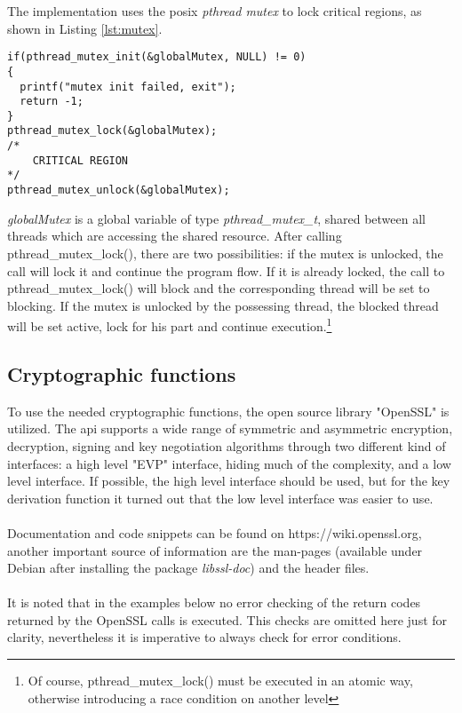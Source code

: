 The implementation uses the \gls{posix} \textit{pthread mutex} to lock critical regions, as shown in Listing \ref{lst:mutex}.  
\begin{lstlisting}[style=cStyle,caption={Locking a critical region},label=lst:mutex]
if(pthread_mutex_init(&globalMutex, NULL) != 0)
{
  printf("mutex init failed, exit");
  return -1;
}
pthread_mutex_lock(&globalMutex);
/*
    CRITICAL REGION
*/
pthread_mutex_unlock(&globalMutex);
\end{lstlisting}
\textit{globalMutex} is a global variable of type \textit{pthread\_mutex\_t}, shared between all threads which are accessing the shared resource. After calling pthread\_mutex\_lock(),
there are two possibilities: if the mutex is unlocked, the call will lock it and continue the program flow. If it is already locked, the call to pthread\_mutex\_lock() will block and
the corresponding thread will be set to blocking.
If the mutex is unlocked by the possessing thread, the blocked thread will be set active, lock for his part and continue execution.\footnote{Of course, pthread\_mutex\_lock() must
be executed in an atomic way, otherwise introducing a race condition on another level}

\subsection{Cryptographic functions}
To use the needed cryptographic functions, the open source library "OpenSSL" is utilized. The \gls{api} supports a wide range of symmetric and asymmetric encryption, 
decryption, signing and key negotiation algorithms through two different kind of interfaces: a high level "EVP" interface, hiding much of the complexity, and 
a low level interface. If possible, the high level interface should be used, but for the key derivation function it turned out that the low level interface was easier to use.
\\
\\
Documentation and code snippets can be found on https://wiki.openssl.org, another important source of information are the man-pages (available under Debian after installing the
package \textit{libssl-doc}) and the header files.
\\
\\
It is noted that in the examples below no error checking of the return codes returned by the OpenSSL calls is executed. This checks are omitted here just for clarity, nevertheless it is
imperative to always check for error conditions.

